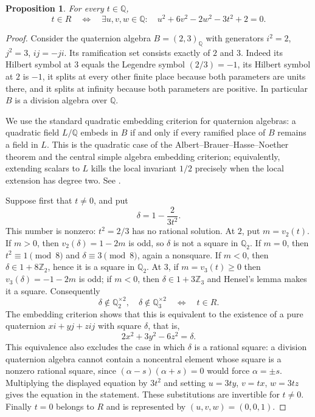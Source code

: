 \documentclass[11pt]{article}
\newtheorem{proposition}{Proposition}
\begin{document}
\begin{proposition}\label{prop:explicit-semilocal}
For every $t\in\mathbb Q$,
\[
 t\in R\quad\Longleftrightarrow\quad
 \exists u,v,w\in\mathbb Q:\quad
 u^2+6v^2-2w^2-3t^2+2=0.
\]
\end{proposition}
\begin{proof}
Consider the quaternion algebra $B=(2,3)_{\mathbb Q}$ with generators
$i^2=2$, $j^2=3$, $ij=-ji$. Its ramification set consists exactly of
$2$ and $3$. Indeed its Hilbert symbol at $3$ equals the Legendre symbol
$(2/3)=-1$, its Hilbert symbol at $2$ is $-1$, it splits at every other
finite place because both parameters are units there, and it splits at
infinity because both parameters are positive. In particular $B$ is a
division algebra over $\mathbb Q$.

We use the standard quadratic embedding criterion for quaternion algebras:
a quadratic field $L/\mathbb Q$ embeds in $B$ if and only if every ramified
place of $B$ remains a field in $L$. This is the quadratic case of the
Albert--Brauer--Hasse--Noether theorem and the central simple algebra
embedding criterion; equivalently, extending scalars to $L$ kills the
local invariant $1/2$ precisely when the local extension has degree two.
See \cite[Chapter 14]{Voight2021}.

Suppose first that $t\ne0$, and put
\[
 \delta=1-\frac{2}{3t^2}.
\]
This number is nonzero: $t^2=2/3$ has no rational solution.
At $2$, put $m=v_2(t)$. If $m>0$, then $v_2(\delta)=1-2m$ is odd,
so $\delta$ is not a square in $\mathbb Q_2$. If $m=0$, then
$t^2\equiv1\pmod8$ and $\delta\equiv3\pmod8$, again a nonsquare.
If $m<0$, then $\delta\in1+8\mathbb Z_2$, hence it is a square in
$\mathbb Q_2$. At $3$, if $m=v_3(t)\ge0$ then
$v_3(\delta)=-1-2m$ is odd; if $m<0$, then
$\delta\in1+3\mathbb Z_3$ and Hensel's lemma makes it a square.
Consequently
\[
 \delta\notin\mathbb Q_2^{\times2},\quad
 \delta\notin\mathbb Q_3^{\times2}
 \quad\Longleftrightarrow\quad t\in R.
\]
The embedding criterion shows that this is equivalent to the existence
of a pure quaternion $xi+yj+zij$ with square $\delta$, that is,
\[
 2x^2+3y^2-6z^2=\delta.
\]
This equivalence also excludes the case in which $\delta$ is a rational
square: a division quaternion algebra cannot contain a noncentral element
whose square is a nonzero rational square, since
$(\alpha-s)(\alpha+s)=0$ would force $\alpha=\pm s$.
Multiplying the displayed equation by $3t^2$ and setting
$u=3ty$, $v=tx$, $w=3tz$ gives the equation in the statement.
These substitutions are invertible for $t\ne0$.
Finally $t=0$ belongs to $R$ and is represented by $(u,v,w)=(0,0,1)$.
\end{proof}
\end{document}
